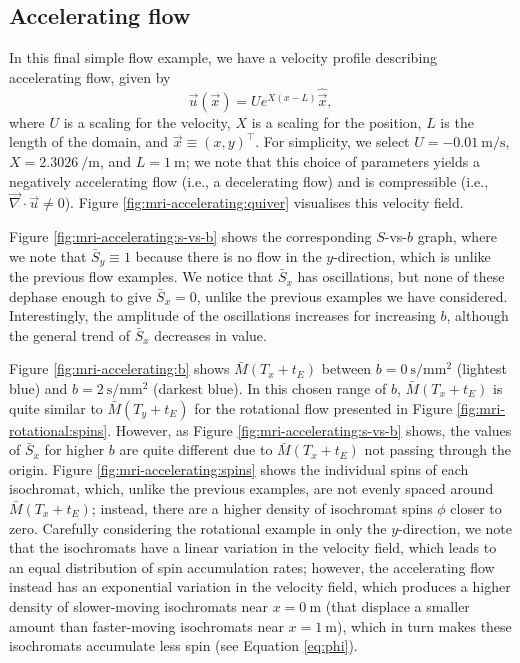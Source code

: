         \subsection{Accelerating flow} \label{sec:numerical-mri:manufactured:accelerating}
            In this final simple flow example, we have a velocity profile describing accelerating flow, given by
            \begin{equation}
                \vec{u}(\vec{x}) = U e^{X(x-L)} \hat{\vec{x}},
                \label{eq:mri-accelerating}
            \end{equation}
            where $U$ is a scaling for the velocity, $X$ is a scaling for the position, $L$ is the length of the domain, and $\vec{x} \equiv (x, y)^\intercal$. For simplicity, we select $U = \qty{-0.01}{\metre\per\second}$, $X = \qty{2.3026}{\per\metre}$, and $L = \qty{1}{\metre}$; we note that this choice of parameters yields a negatively accelerating flow (i.e., a decelerating flow) and is compressible (i.e., $\vec{\nabla} \cdot \vec{u} \neq 0$). Figure \ref{fig:mri-accelerating:quiver} visualises this velocity field.
            
            Figure \ref{fig:mri-accelerating:s-vs-b} shows the corresponding $S$-vs-$b$ graph, where we note that $\bar{S}_y \equiv 1$ because there is no flow in the $y$-direction, which is unlike the previous flow examples. We notice that $\bar{S}_x$ has oscillations, but none of these dephase enough to give $\bar{S}_x=0$, unlike the previous examples we have considered. Interestingly, the amplitude of the oscillations increases for increasing $b$, although the general trend of $\bar{S}_x$ decreases in value.
            
            Figure \ref{fig:mri-accelerating:b} shows $\bar{M}(T_x + t_E)$ between $b=\qty{0}{\second\per\milli\metre^2}$ (lightest blue) and $b=\qty{2}{\second\per\milli\metre^2}$ (darkest blue). In this chosen range of $b$, $\bar{M}(T_x + t_E)$ is quite similar to $\bar{M}(T_y + t_E)$ for the rotational flow presented in Figure \ref{fig:mri-rotational:spins}. However, as Figure \ref{fig:mri-accelerating:s-vs-b} shows, the values of $\bar{S}_x$ for higher $b$ are quite different due to $\bar{M}(T_x + t_E)$ not passing through the origin. Figure \ref{fig:mri-accelerating:spins} shows the individual spins of each isochromat, which, unlike the previous examples, are not evenly spaced around $\bar{M}(T_x + t_E)$; instead, there are a higher density of isochromat spins $\phi$ closer to zero. Carefully considering the rotational example in only the $y$-direction, we note that the isochromats have a linear variation in the velocity field, which leads to an equal distribution of spin accumulation rates; however, the accelerating flow instead has an exponential variation in the velocity field, which produces a higher density of slower-moving isochromats near $x=\qty{0}{\metre}$ (that displace a smaller amount than faster-moving isochromats near $x=\qty{1}{\metre}$), which in turn makes these isochromats accumulate less spin (see Equation \eqref{eq:phi}).

